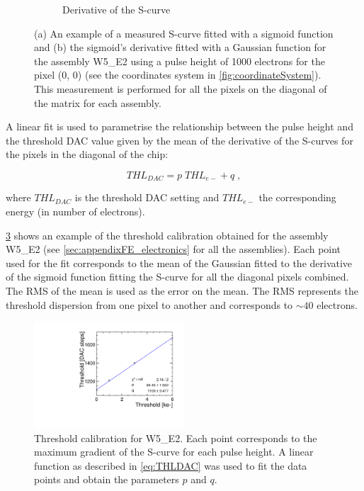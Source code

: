 \begin{figure}[htbp]
\begin{subfigure}[b]{0.45\textwidth}
    \caption{Derivative of the S-curve}
    \label{fig:deriv_example}
  \end{subfigure}
  \caption{(a) An example of a measured S-curve fitted with a sigmoid
    function and (b) the sigmoid's derivative fitted with a Gaussian
    function for the assembly W5\_E2 using a pulse height of 1000
    electrons for the pixel (0, 0) (see the coordinates system in
    \cref{fig:coordinateSystem}). This measurement is performed for
    all the pixels on the diagonal of the matrix for each assembly.}
  \label{fig:scurve_deriv_example}
\end{figure}

A linear fit is used to parametrise the relationship between the pulse
height and the threshold DAC value given by the mean of the derivative
of the S-curves for the pixels in the diagonal of the chip:

\begin{equation}
  THL_{DAC}=p \; THL_{e-} + q \; ,
  \label{eq:THLDAC}
\end{equation}

where $THL_{DAC}$ is the threshold DAC setting and $THL_{e-}$ the
corresponding energy (in number of electrons). 

\cref{fig:THLcalib_55-GNDGR-100} shows an example of the threshold
calibration obtained for the assembly W5\_E2 (see
\cref{sec:appendixFE_electronics} for all the assemblies). Each point
used for the fit corresponds to the mean of the Gaussian fitted to the
derivative of the sigmoid function fitting the S-curve for all the
diagonal pixels combined. The RMS of the mean is used as the error on
the mean. The RMS represents the threshold dispersion from one pixel
to another and corresponds to $\sim40$ electrons.

\begin{figure}[htbp]
  \centering
  \includegraphics[width=0.5\textwidth]{./figures/Calibration/THLcalibration_W0005_E02.pdf}
  \caption{Threshold calibration for W5\_E2. Each point corresponds to
    the maximum gradient of the S-curve for each pulse height. A
    linear function as described in \cref{eq:THLDAC} was used to fit
    the data points and obtain the parameters $p$ and $q$.}
  \label{fig:THLcalib_55-GNDGR-100}
\end{figure}

